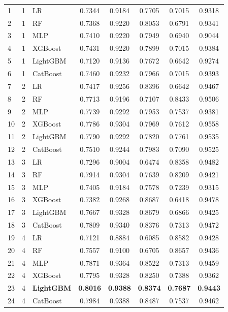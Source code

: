 \documentclass[diagnostics,article,accept,pdftex,moreauthors]{Definitions/mdpi}
\begin{document}
\begin{table}[H]
\begin{tabularx}{\linewidth}{LlLCCCCC}
1  & 1  & LR       & 0.7344 & 0.9184 & 0.7705 & 0.7015 & 0.9318 \\
2  & 1  & RF       & 0.7368 & 0.9220 & 0.8053 & 0.6791 & 0.9341 \\
3  & 1  & MLP      & 0.7410 & 0.9220 & 0.7949 & 0.6940 & 0.9044 \\
4  & 1  & XGBoost  & 0.7431 & 0.9220 & 0.7899 & 0.7015 & 0.9384 \\
5  & 1  & LightGBM & 0.7120 & 0.9136 & 0.7672 & 0.6642 & 0.9274 \\
6  & 1  & CatBoost & 0.7460 & 0.9232 & 0.7966 & 0.7015 & 0.9393 \\
7  & 2  & LR       & 0.7417 & 0.9256 & 0.8396 & 0.6642 & 0.9467 \\
8  & 2  & RF       & 0.7713 & 0.9196 & 0.7107 & 0.8433 & 0.9506 \\
9  & 2  & MLP      & 0.7739 & 0.9292 & 0.7953 & 0.7537 & 0.9381 \\
10 & 2  & XGBoost  & 0.7786 & 0.9304 & 0.7969 & 0.7612 & 0.9558 \\
11 & 2  & LightGBM & 0.7790 & 0.9292 & 0.7820 & 0.7761 & 0.9535 \\
12 & 2  & CatBoost & 0.7510 & 0.9244 & 0.7983 & 0.7090 & 0.9525 \\
13 & 3  & LR       & 0.7296 & 0.9004 & 0.6474 & 0.8358 & 0.9482 \\
14 & 3  & RF       & 0.7914 & 0.9304 & 0.7639 & 0.8209 & 0.9421 \\
15 & 3  & MLP      & 0.7405 & 0.9184 & 0.7578 & 0.7239 & 0.9315 \\
16 & 3  & XGBoost  & 0.7382 & 0.9268 & 0.8687 & 0.6418 & 0.9478 \\
17 & 3  & LightGBM & 0.7667 & 0.9328 & 0.8679 & 0.6866 & 0.9425 \\
18 & 3  & CatBoost & 0.7809 & 0.9340 & 0.8376 & 0.7313 & 0.9472 \\
19 & 4  & LR       & 0.7121 & 0.8884 & 0.6085 & 0.8582 & 0.9428 \\
20 & 4  & RF       & 0.7557 & 0.9100 & 0.6705 & 0.8657 & 0.9436 \\
21 & 4  & MLP      & 0.7871 & 0.9364 & 0.8522 & 0.7313 & 0.9459 \\
22 & 4  & XGBoost  & 0.7795 & 0.9328 & 0.8250 & 0.7388 & 0.9362 \\
23 & 4  & \textbf{LightGBM} & \textbf{0.8016} & \textbf{0.9388} & \textbf{0.8374} & \textbf{0.7687} & \textbf{0.9443} \\
24 & 4  & CatBoost & 0.7984 & 0.9388 & 0.8487 & 0.7537 & 0.9462 \\

\end{tabularx}
\end{table}
\end{document}
